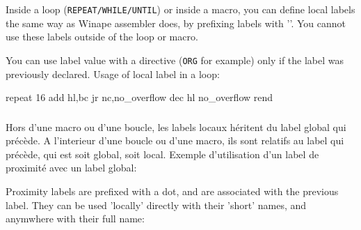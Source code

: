 \begin{xen}
Inside a loop (\texttt{REPEAT/WHILE/UNTIL}) or inside a macro, you can define local labels the same way as Winape assembler does, by prefixing labels with '\at'.
You cannot use these labels outside of the loop or macro.


You can use label value with a directive (\texttt{ORG} for example) only if the label was previously declared.
Usage of local label in a loop:


\end{xen}

%
%

\begin{code}
repeat 16
  add hl,bc
  jr nc,\at no\_overflow
  dec hl
\at no\_overflow
rend
\end{code}

\subsubsection{}

\begin{xfr}
Hors d'une macro ou d'une boucle, les labels locaux héritent du label global qui précède. 
A l'interieur d'une boucle ou d'une macro, ils sont relatifs au label qui précède, qui est soit global, soit local.
Exemple d'utilisation d'un label de proximité avec un label global:
\end{xfr}

\begin{xen}
Proximity labels are prefixed with a dot, and are associated with the previous label. 
They can be used 'locally' directly with their 'short' names, and anymwhere with their full name:
\end{xen}

